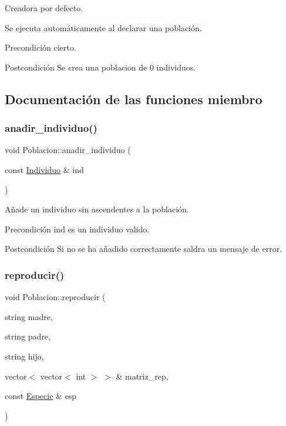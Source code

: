 Creadora por defecto. 

Se ejecuta automáticamente al declarar una población. \begin{DoxyPrecond}{Precondición}
cierto. 
\end{DoxyPrecond}
\begin{DoxyPostcond}{Postcondición}
Se crea una poblacion de 0 individuos. 
\end{DoxyPostcond}


\subsection{Documentación de las funciones miembro}
\mbox{\label{class_poblacion_a4622ccceef105548460351376791f8f6}} 
\subsubsection{\texorpdfstring{anadir\+\_\+individuo()}{anadir\_individuo()}}
{\footnotesize\ttfamily void Poblacion\+::anadir\+\_\+individuo (\begin{DoxyParamCaption}\item[{const \hyperlink{class_individuo}{Individuo} \&}]{ind }\end{DoxyParamCaption})}



Añade un individuo sin ascendentes a la población. 

\begin{DoxyPrecond}{Precondición}
ind es un individuo valido. 
\end{DoxyPrecond}
\begin{DoxyPostcond}{Postcondición}
Si no se ha añadido correctamente saldra un mensaje de error. 
\end{DoxyPostcond}
\mbox{\label{class_poblacion_a83e45d5057cb4496647d0aed76071876}} 
\subsubsection{\texorpdfstring{reproducir()}{reproducir()}}
{\footnotesize\ttfamily void Poblacion\+::reproducir (\begin{DoxyParamCaption}\item[{string}]{madre,  }\item[{string}]{padre,  }\item[{string}]{hijo,  }\item[{vector$<$ vector$<$ int $>$ $>$ \&}]{matriz\+\_\+rep,  }\item[{const \hyperlink{class_especie}{Especie} \&}]{esp }\end{DoxyParamCaption})}



